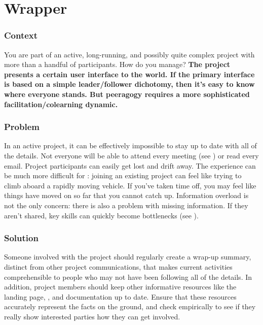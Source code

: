 
\section{Wrapper}\label{sec:Wrapper}

\subsubsection*{Context} You are part of an active, long-running, and possibly quite complex project with more than a handful of participants.  How do you manage?
\textbf{The project presents a certain user interface to the world.  If the primary interface is based on a simple leader/follower dichotomy, then it's easy to know where everyone stands.  But peeragogy requires a more sophisticated facilitation/colearning dynamic.}

\subsubsection*{Problem} In an active project, it can be effectively impossible to stay up to date with all of the details.  Not everyone will be able to attend every meeting (see ) or read every email.  Project participants can easily get lost and drift away.  The experience can be much more difficult for : joining an existing project can feel like trying to climb aboard a rapidly moving vehicle.  If you've taken time off, you may feel like things have moved on so far that you cannot catch up.  Information overload is not the only concern: there is also a problem with missing information.  If they aren't shared, key skills can quickly become bottlenecks (see ).

\subsubsection*{Solution}
Someone involved with the project should regularly create a wrap-up summary, distinct from other project communications, that makes current activities comprehensible to people who may not have been following all of the details.  In addition, project members should keep other informative resources like the landing page, , and documentation up to date.  Ensure that these resources accurately represent the facts on the ground, and check empirically to see if they really show interested parties how they can get involved.

